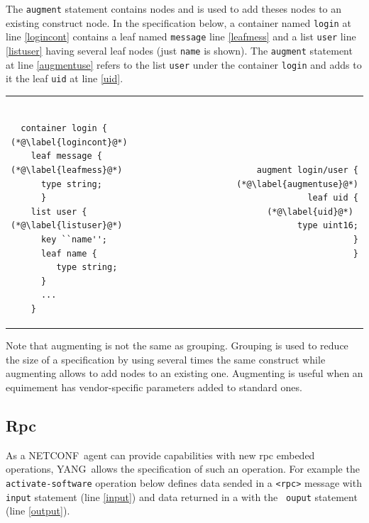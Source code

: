 \documentclass[a4paper]{article}
\newcommand{\nc}{NETCONF}
\newcommand{\y}{YANG}
\begin{document}
The {\tt augment}  statement contains nodes and is  used to add theses
nodes to  an existing  construct node. In  the specification  below, a
container named  {\tt login} at  line \ref{logincont} contains  a leaf
named {\tt  message} line  \ref{leafmess} and a  list {\tt  user} line
\ref{listuser} having  several leaf nodes (just {\tt  name} is shown).
The  {\tt augment} statement  at line  \ref{augmentuse} refers  to the
list {\tt  user} under the  container {\tt login}  and adds to  it the
leaf {\tt uid} at line \ref{uid}.

\noindent
\begin{tabular}{lr}
\begin{minipage}{.5\textwidth}
\begin{lstlisting}[name=augment]

  container login { (*@\label{logincont}@*)
    leaf message {  (*@\label{leafmess}@*)
      type string;
      }
    list user {      (*@\label{listuser}@*)
      key ``name'';
      leaf name { 
         type string;
      }
      ...
    }
\end{lstlisting}
\end{minipage}
&
\begin{minipage}{.5\textwidth}
\begin{lstlisting}[name=augment]
augment login/user {  (*@\label{augmentuse}@*)
  leaf uid {           (*@\label{uid}@*) 
    type uint16;
  }
}
\end{lstlisting}
\end{minipage}
\end{tabular}

Note that augmenting is not the  same as grouping. Grouping is used to
reduce the  size of  a specification by  using several times  the same
construct  while  augmenting  allows  to  add  nodes  to  an  existing
one.  Augmenting  is useful  when  an  equimement has  vendor-specific
parameters added to standard ones.

\subsection{Rpc}

As  a  \nc\  agent  can  provide capabilities  with  new  rpc  embeded
operations,  \y\ allows the  specification of  such an  operation. For
example  the  {\tt  activate-software}  operation below  defines  data
sended  in a  {\tt <rpc>}  message  with {\tt  input} statement  (line
\ref{input}) and  data returned in  a {\tt <rpc-reply>} with  the {\tt
ouput} statement (line \ref{output}).
\end{document}
